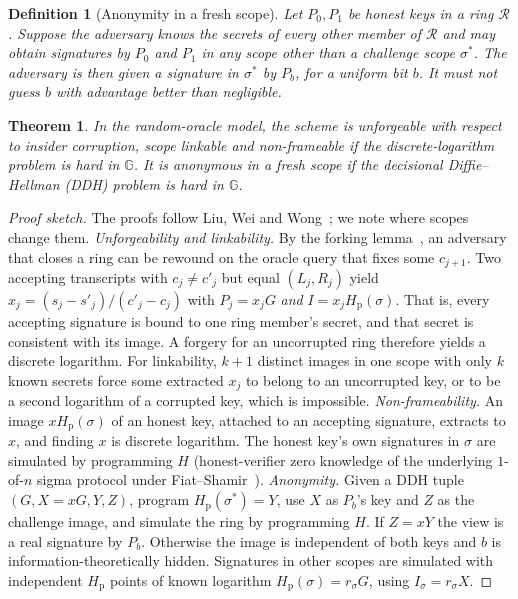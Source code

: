\documentclass[11pt]{article}
\newtheorem{definition}{Definition}
\newtheorem{theorem}{Theorem}
\theoremstyle{remark}
\newcommand{\G}{\mathbb{G}}
\newcommand{\Hp}{H_{\mathrm{p}}}
\newcommand{\Hs}{H}
\newcommand{\Ring}{\mathcal{R}}
\begin{document}
\begin{definition}[Anonymity in a fresh scope]
Let $P_0, P_1$ be honest keys in a ring $\Ring$. Suppose the adversary knows the secrets of every other member of $\Ring$ and may obtain signatures by $P_0$ and $P_1$ in any scope other than a challenge scope $\sigma^*$. The adversary is then given a signature in $\sigma^*$ by $P_b$, for a uniform bit $b$. It must not guess $b$ with advantage better than negligible.
\end{definition}

\begin{theorem}\label{thm:scheme}
In the random-oracle model, the scheme is unforgeable with respect to insider corruption, scope linkable and non-frameable if the discrete-logarithm problem is hard in $\G$. It is anonymous in a fresh scope if the decisional Diffie--Hellman (DDH) problem is hard in $\G$.
\end{theorem}

\begin{proof}[Proof sketch]
The proofs follow Liu, Wei and Wong~\cite{lww04}; we note where scopes change them. \emph{Unforgeability and linkability.} By the forking lemma~\cite{ps00}, an adversary that closes a ring can be rewound on the oracle query that fixes some $c_{j+1}$. Two accepting transcripts with $c_j\neq c'_j$ but equal $(L_j,R_j)$ yield $x_j = (s_j - s'_j)/(c'_j - c_j)$ with $P_j = x_jG$ \emph{and} $I = x_j\Hp(\sigma)$. That is, every accepting signature is bound to one ring member's secret, and that secret is consistent with its image. A forgery for an uncorrupted ring therefore yields a discrete logarithm. For linkability, $k+1$ distinct images in one scope with only $k$ known secrets force some extracted $x_j$ to belong to an uncorrupted key, or to be a second logarithm of a corrupted key, which is impossible. \emph{Non-frameability.} An image $x\Hp(\sigma)$ of an honest key, attached to an accepting signature, extracts to $x$, and finding $x$ is discrete logarithm. The honest key's own signatures in $\sigma$ are simulated by programming $\Hs$ (honest-verifier zero knowledge of the underlying $1$-of-$n$ sigma protocol under Fiat--Shamir~\cite{fiatshamir}). \emph{Anonymity.} Given a DDH tuple $(G, X = xG, Y, Z)$, program $\Hp(\sigma^*) = Y$, use $X$ as $P_b$'s key and $Z$ as the challenge image, and simulate the ring by programming $\Hs$. If $Z = xY$ the view is a real signature by $P_b$. Otherwise the image is independent of both keys and $b$ is information-theoretically hidden. Signatures in other scopes are simulated with independent $\Hp$ points of known logarithm $\Hp(\sigma)=r_\sigma G$, using $I_\sigma = r_\sigma X$.
\end{proof}
\end{document}
